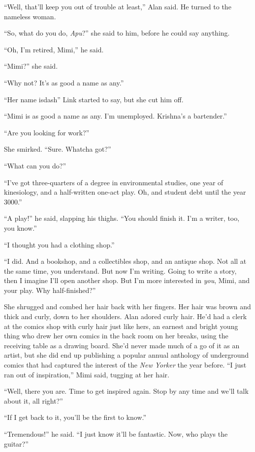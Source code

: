 ``Well, that'll keep you out of trouble at least,'' Alan said.  He
turned to the nameless woman.

``So, what do you do, \textit{Apu}?'' she said to him, before he could
say anything.

``Oh, I'm retired, Mimi,'' he said.

``Mimi?'' she said.

``Why not?  It's as good a name as any.''

``Her name isdash{}'' Link started to say, but she cut him off.

``Mimi is as good a name as any.  I'm unemployed.  Krishna's a
bartender.''

``Are you looking for work?''

She smirked.  ``Sure.  Whatcha got?''

``What can you do?''

``I've got three-quarters of a degree in environmental studies, one
year of kinesiology, and a half-written one-act play.  Oh, and student
debt until the year 3000.''

``A play!'' he said, slapping his thighs.  ``You should finish it. 
I'm a writer, too, you know.''

``I thought you had a clothing shop.''

``I did.  And a bookshop, and a collectibles shop, and an antique
shop.  Not all at the same time, you understand.  But now I'm writing. 
Going to write a story, then I imagine I'll open another shop.  But
I'm more interested in \textit{you}, Mimi, and your play.  Why
half-finished?''

She shrugged and combed her hair back with her fingers.  Her hair was
brown and thick and curly, down to her shoulders.  Alan adored curly
hair.  He'd had a clerk at the comics shop with curly hair just like
hers, an earnest and bright young thing who drew her own comics in the
back room on her breaks, using the receiving table as a drawing board. 
She'd never made much of a go of it as an artist, but she did end up
publishing a popular annual anthology of underground comics that had
captured the interest of the \textit{New Yorker} the year before.  ``I
just ran out of inspiration,'' Mimi said, tugging at her hair.

``Well, there you are.  Time to get inspired again.  Stop by any time
and we'll talk about it, all right?''

``If I get back to it, you'll be the first to know.''

``Tremendous!'' he said.  ``I just know it'll be fantastic.  Now, who
plays the guitar?''

